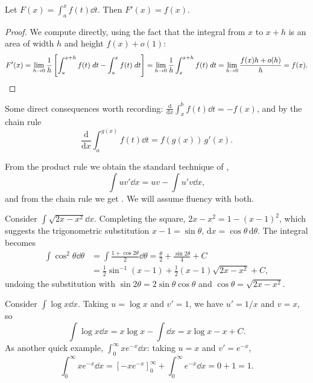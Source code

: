 \documentclass[a4paper]{scrartcl}
\begin{document}
\begin{theorem}
	Let $F(x) = \int_a^x f(t) \dd t$. Then $F'(x) = f(x)$.
\end{theorem}
\begin{proof}
	We compute directly, using the fact that the integral from $x$ to $x + h$ is an area of width $h$ and height $f(x) + o(1)$:
	$$
	F'(x) = \lim_{h \to 0} \frac{1}{h}\left[\int_a^{x + h} f(t) \; d t - \int_a^x f(t) \; d t \right] = \lim_{h \to 0} \frac{1}{h} \int_x^{x + h} f(t) \; d t = \lim_{h \to 0} \frac{f(x) h + o(h)}{h} = f(x). \qedhere
	$$
\end{proof}

Some direct consequences worth recording: $\frac{\mathrm{d}}{\mathrm{d}x}\int_x^b f(t) \dd t = -f(x)$, and by the chain rule
$$
\frac{\mathrm{d}}{\mathrm{d}x} \int_a^{g(x)} f(t) \dd t = f(g(x))\, g'(x).
$$

From the product rule we obtain the standard technique of ,
$$
\int u v' \dd x = uv - \int u' v \dd x,
$$
and from the chain rule we get . We will assume fluency with both.

\begin{example}
	Consider $\int \sqrt{2x - x^2} \dd x$. Completing the square, $2x - x^2 = 1 - (x - 1)^2$, which suggests the trigonometric substitution $x - 1 = \sin\theta$, $\mathrm{d}x = \cos \theta \, \mathrm{d}\theta$. The integral becomes
	\begin{align*}
		\int \cos^2 \theta \dd \theta &= \int \frac{1 + \cos 2\theta}{2} \dd\theta = \frac{\theta}{2} + \frac{\sin 2\theta}{4} + C \\
		&= \frac{1}{2}\sin^{-1}(x - 1) + \frac{1}{2}(x - 1)\sqrt{2x - x^2} + C,
	\end{align*}
	undoing the substitution with $\sin 2\theta = 2 \sin\theta\cos\theta$ and $\cos \theta = \sqrt{2x - x^2}$.
\end{example}

\begin{example}
	Consider $\int \log x \dd x$. Taking $u = \log x$ and $v' = 1$, we have $u' = 1/x$ and $v = x$, so
	$$
	\int \log x \dd x = x \log x - \int \dd x = x \log x - x + C.
	$$
	As another quick example, $\int_0^\infty x e^{-x} \dd x$: taking $u = x$ and $v' = e^{-x}$,
	$$
	\int_0^\infty x e^{-x} \dd x = \left[-x e^{-x}\right]_0^\infty + \int_0^\infty e^{-x} \dd x = 0 + 1 = 1.
	$$
\end{example}
\end{document}
